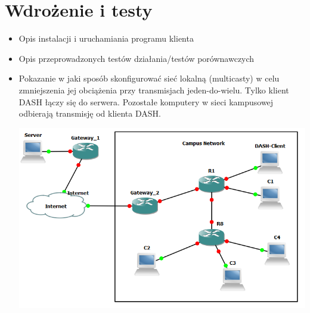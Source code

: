 \chapter{Wdrożenie i testy}
\label{cha:rozdzial6}

\begin{itemize}
\item Opis instalacji i uruchamiania programu klienta
\item Opis przeprowadzonych testów działania/testów porównawczych
\item Pokazanie w jaki sposób skonfigurować sieć lokalną (multicasty) w celu zmniejszenia jej obciążenia przy transmisjach jeden-do-wielu. Tylko klient DASH łączy się do serwera. Pozostałe komputery w sieci kampusowej odbierają transmisję od klienta DASH.
\begin{center}
\includegraphics[scale=0.7]{lan}
\end{center}
\end{itemize}